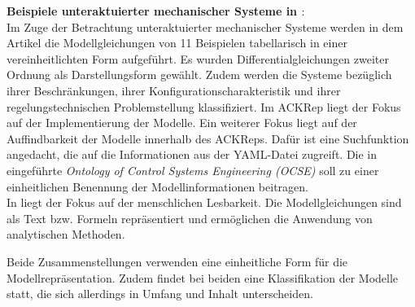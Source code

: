 \textbf{Beispiele unteraktuierter mechanischer Systeme in \cite{LIYU13}}:\\
Im Zuge der Betrachtung unteraktuierter mechanischer Systeme werden in dem Artikel die Modellgleichungen von 11 Beispielen tabellarisch in einer vereinheitlichten Form aufgeführt. Es wurden Differentialgleichungen zweiter Ordnung als Darstellungsform gewählt. Zudem werden die Systeme bezüglich ihrer Beschränkungen, ihrer Konfigurationscharakteristik und ihrer regelungstechnischen Problemstellung klassifiziert.
Im ACKRep liegt der Fokus auf der Implementierung der Modelle. Ein weiterer Fokus liegt auf der Auffindbarkeit der Modelle innerhalb des ACKReps. Dafür ist eine Suchfunktion angedacht, die auf die Informationen aus der YAML-Datei zugreift. Die in \cite{KNHE20b} eingeführte \textit{Ontology of Control Systems Engineering (OCSE)} soll zu einer einheitlichen Benennung der Modellinformationen beitragen.\\
In \cite{LIYU13} liegt der Fokus auf der menschlichen Lesbarkeit. Die Modellgleichungen sind als Text bzw. Formeln repräsentiert und ermöglichen die Anwendung von analytischen Methoden. 

Beide Zusammenstellungen verwenden eine einheitliche Form für die Modellrepräsentation. Zudem findet bei beiden eine Klassifikation der Modelle statt, die sich allerdings in Umfang und Inhalt unterscheiden.
